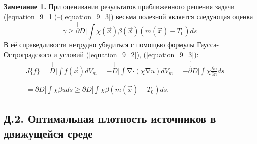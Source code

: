 \textbf{Замечание 1. }  При оценивании результатов приближенного решения задачи (\ref{equation_9_1})--(\ref{equation_9_3}) весьма полезной является следующая оценка
 			\begin{equation} \label{equation_9_7}
            \gamma \ge \stackrel[\partial D]{}{\int} \chi(\vec x)\beta(\vec x)(m(\vec x)-T_0) ds
            \end{equation}
В её справедливости нетрудно убедиться с помощью формулы Гаусса-Остроградского и условий (\ref{equation_9_2}), (\ref{equation_9_3}):
            \begin{eqnarray*}
            & J\{f\}{=}\stackrel[D]{}{\int}f(\vec x)dV_m{=}{-}\stackrel[D]{}{\int}\mathop{\nabla}\cdot(\chi\mathop{\nabla}u)dV_m{=}{-}\stackrel[\partial D]{}{\int}\chi\frac{\partial u}{\partial n}ds{=}& \\
            &=\stackrel[\partial D]{}{\int}\chi\beta uds\ge \stackrel[\partial D]{}{\int}\chi\beta (m(\vec x)-T_0)ds.&
            \end{eqnarray*}
\subsection*{ \center Д.2. Оптимальная плотность источников в движущейся среде}

